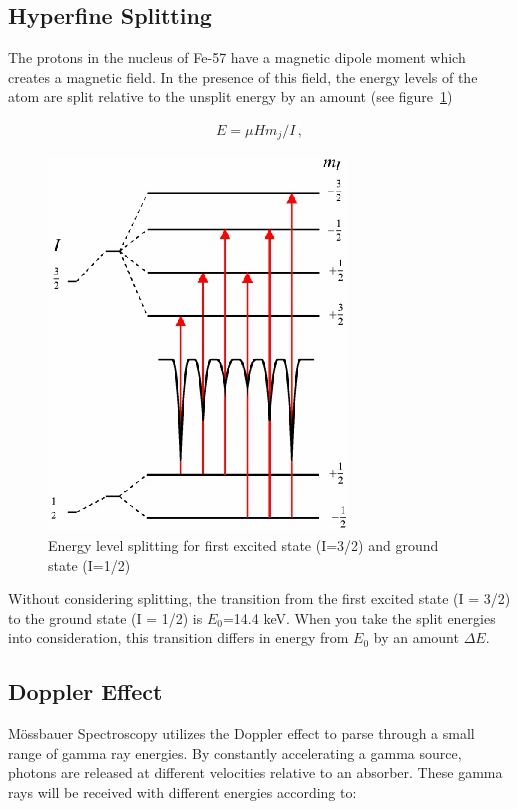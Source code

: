 \documentclass[letterpaper,12pt]{article}
\begin{document}
\subsection{Hyperfine Splitting}

    The protons in the nucleus of Fe-57 have a magnetic dipole moment which creates a magnetic field. In the presence of this field, the energy levels of the atom are split relative to the unsplit energy by an amount (see figure~\ref{fig:elevels})

    \begin{eqnarray}
        E = \mu Hm_{j}/I \label{eqn:split}\,,
    \end{eqnarray}

    \begin{figure}[ht] 
        \centering \includegraphics[scale=0.65]{hyperfine levels.jpeg}
        \caption{
                \label{fig:elevels}
                Energy level splitting for first excited state (I=3/2) and ground state (I=1/2)
        }
    \end{figure}

    Without considering splitting, the transition from the first excited state (I = 3/2) to the ground state (I = 1/2) is $E_0$=14.4 keV. When you take the split energies into consideration, this transition differs in energy from $E_0$ by an amount $\Delta E$.


\subsection{Doppler Effect}

    Mössbauer Spectroscopy utilizes the Doppler effect to parse through a small range of gamma ray energies. By constantly accelerating a gamma source, photons are released at different velocities relative to an absorber. These gamma rays will be received with different energies according to:
\end{document}
